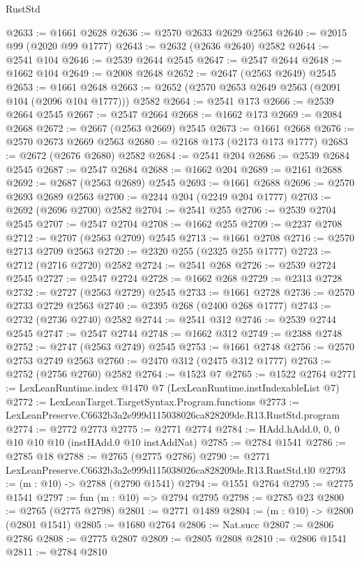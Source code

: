 \begin{lexlean}{RustStd}
\begin{coremodule}
@2633 := @1661 @2628
@2636 := @2570 @2633 @2629 @2563
@2640 := @2015 @99 (@2020 @99 @1777)
@2643 := @2632 (@2636 @2640) @2582
@2644 := @2541 @104
@2646 := @2539 @2644 @2545
@2647 := @2547 @2644
@2648 := @1662 @104
@2649 := @2008 @2648
@2652 := @2647 (@2563 @2649) @2545
@2653 := @1661 @2648
@2663 := @2652 (@2570 @2653 @2649 @2563 (@2091 @104 (@2096 @104 @1777))) @2582
@2664 := @2541 @173
@2666 := @2539 @2664 @2545
@2667 := @2547 @2664
@2668 := @1662 @173
@2669 := @2084 @2668
@2672 := @2667 (@2563 @2669) @2545
@2673 := @1661 @2668
@2676 := @2570 @2673 @2669 @2563
@2680 := @2168 @173 (@2173 @173 @1777)
@2683 := @2672 (@2676 @2680) @2582
@2684 := @2541 @204
@2686 := @2539 @2684 @2545
@2687 := @2547 @2684
@2688 := @1662 @204
@2689 := @2161 @2688
@2692 := @2687 (@2563 @2689) @2545
@2693 := @1661 @2688
@2696 := @2570 @2693 @2689 @2563
@2700 := @2244 @204 (@2249 @204 @1777)
@2703 := @2692 (@2696 @2700) @2582
@2704 := @2541 @255
@2706 := @2539 @2704 @2545
@2707 := @2547 @2704
@2708 := @1662 @255
@2709 := @2237 @2708
@2712 := @2707 (@2563 @2709) @2545
@2713 := @1661 @2708
@2716 := @2570 @2713 @2709 @2563
@2720 := @2320 @255 (@2325 @255 @1777)
@2723 := @2712 (@2716 @2720) @2582
@2724 := @2541 @268
@2726 := @2539 @2724 @2545
@2727 := @2547 @2724
@2728 := @1662 @268
@2729 := @2313 @2728
@2732 := @2727 (@2563 @2729) @2545
@2733 := @1661 @2728
@2736 := @2570 @2733 @2729 @2563
@2740 := @2395 @268 (@2400 @268 @1777)
@2743 := @2732 (@2736 @2740) @2582
@2744 := @2541 @312
@2746 := @2539 @2744 @2545
@2747 := @2547 @2744
@2748 := @1662 @312
@2749 := @2388 @2748
@2752 := @2747 (@2563 @2749) @2545
@2753 := @1661 @2748
@2756 := @2570 @2753 @2749 @2563
@2760 := @2470 @312 (@2475 @312 @1777)
@2763 := @2752 (@2756 @2760) @2582
@2764 := @1523 @7
@2765 := @1522 @2764
@2771 := LexLeanRuntime.index @1470 @7 (LexLeanRuntime.instIndexableList @7)
@2772 := LexLeanTarget.TargetSyntax.Program.functions
@2773 := LexLeanPreserve.C6632b3a2e999d115038026ca828209de.R13.RustStd.program
@2774 := @2772 @2773
@2775 := @2771 @2774
@2784 := HAdd.hAdd.{0, 0, 0} @10 @10 @10 (instHAdd.{0} @10 instAddNat)
@2785 := @2784 @1541
@2786 := @2785 @18
@2788 := @2765 (@2775 @2786)
@2790 := @2771 LexLeanPreserve.C6632b3a2e999d115038026ca828209de.R13.RustStd.tl0
@2793 := (m : @10) -> @2788 (@2790 @1541)
@2794 := @1551 @2764
@2795 := @2775 @1541
@2797 := fun (m : @10) => @2794 @2795
@2798 := @2785 @23
@2800 := @2765 (@2775 @2798)
@2801 := @2771 @1489
@2804 := (m : @10) -> @2800 (@2801 @1541)
@2805 := @1680 @2764
@2806 := Nat.succ
@2807 := @2806 @2786
@2808 := @2775 @2807
@2809 := @2805 @2808
@2810 := @2806 @1541
@2811 := @2784 @2810

\end{coremodule}
\end{lexlean}
